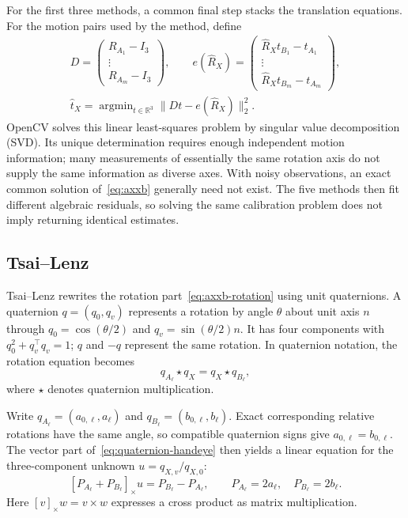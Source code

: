 \documentclass[12pt,a4paper]{article}
\newcommand{\crossmat}[1]{[#1]_{\times}}
\begin{document}
For the first three methods, a common final step stacks the translation equations. For the motion pairs used by the method, define
\begin{equation}\label{eq:translation-fit}
\begin{gathered}
D=\begin{pmatrix}R_{A_1}-I_3\\\vdots\\R_{A_m}-I_3\end{pmatrix},\qquad
e(\widehat R_X)=\begin{pmatrix}\widehat R_Xt_{B_1}-t_{A_1}\\\vdots\\\widehat R_Xt_{B_m}-t_{A_m}\end{pmatrix},\\
\widehat t_X=\mathop{\arg\min}_{t\in\mathbb R^3}
\|Dt-e(\widehat R_X)\|_2^2.
\end{gathered}
\end{equation}
OpenCV solves this linear least-squares problem by singular value decomposition (SVD). Its unique determination requires enough independent motion information; many measurements of essentially the same rotation axis do not supply the same information as diverse axes. With noisy observations, an exact common solution of~\eqref{eq:axxb} generally need not exist. The five methods then fit different algebraic residuals, so solving the same calibration problem does not imply returning identical estimates. \cite{opencv,opencvsource}

\subsection{Tsai--Lenz}
Tsai--Lenz rewrites the rotation part~\eqref{eq:axxb-rotation} using unit quaternions. A quaternion $q=(q_0,q_v)$ represents a rotation by angle $\theta$ about unit axis $n$ through $q_0=\cos(\theta/2)$ and $q_v=\sin(\theta/2)n$. It has four components with $q_0^2+q_v^\top q_v=1$; $q$ and $-q$ represent the same rotation. In quaternion notation, the rotation equation becomes
\begin{equation}\label{eq:quaternion-handeye}
q_{A_\ell}\star q_X=q_X\star q_{B_\ell},
\end{equation}
where $\star$ denotes quaternion multiplication.

Write $q_{A_\ell}=(a_{0,\ell},a_\ell)$ and $q_{B_\ell}=(b_{0,\ell},b_\ell)$. Exact corresponding relative rotations have the same angle, so compatible quaternion signs give $a_{0,\ell}=b_{0,\ell}$. The vector part of~\eqref{eq:quaternion-handeye} then yields a linear equation for the three-component unknown $u=q_{X,v}/q_{X,0}$:
\begin{equation}\label{eq:tsai}
\crossmat{P_{A_\ell}+P_{B_\ell}}u=P_{B_\ell}-P_{A_\ell},\qquad
P_{A_\ell}=2a_\ell,\quad P_{B_\ell}=2b_\ell.
\end{equation}
Here $[v]_\times w=v\times w$ expresses a cross product as matrix multiplication.
\end{document}
